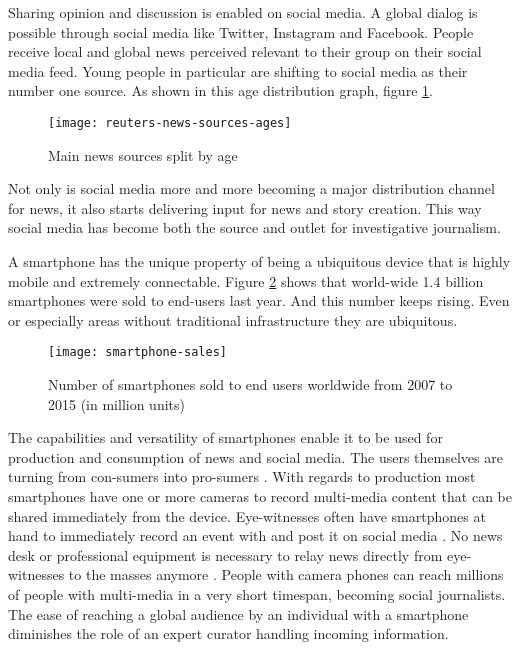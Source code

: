 Sharing opinion and discussion is enabled on social media.
A global dialog is possible through social media like Twitter, Instagram and Facebook.
People receive local and global news perceived relevant to their group on their social media feed.
Young people in particular are shifting to social media as their number one source. \cite{reuters_social_media}
As shown in this age distribution graph, figure \ref{fig:reuters-news-sources-ages}.
\begin{figure}[H]
	\centering
	\texttt{[image: reuters-news-sources-ages]}
	\caption{Main news sources split by age \cite{reuters_social_media}}
	\label{fig:reuters-news-sources-ages}
\end{figure}
Not only is social media more and more becoming a major distribution channel for news, it also starts delivering input for news and story creation.
This way social media has become both the source and outlet for investigative journalism.

A smartphone has the unique property of being a ubiquitous device that is highly mobile and extremely connectable.
Figure \ref{fig:smartphone-sales} shows that world-wide 1.4 billion smartphones were sold to end-users last year.
And this number keeps rising.
Even or especially areas without traditional infrastructure they are ubiquitous.
\begin{figure}[H]
	\centering
	\texttt{[image: smartphone-sales]}
	\caption{Number of smartphones sold to end users worldwide from 2007 to 2015 (in million units) \cite{smartphone-sales}}
	\label{fig:smartphone-sales}
\end{figure}

The capabilities and versatility of smartphones enable it to be used for production and consumption of news and social media.
The users themselves are turning from con-sumers into pro-sumers \cite{??}.
With regards to production most smartphones have one or more cameras to record multi-media content that can be shared immediately from the device.
Eye-witnesses often have smartphones at hand to immediately record an event with and post it on social media \cite{paris-attacks}.
No news desk or professional equipment is necessary to relay news directly from eye-witnesses to the masses anymore \cite{belgium-attacks}.
People with camera phones can reach millions of people with multi-media in a very short timespan, becoming social journalists.
The ease of reaching a global audience by an individual with a smartphone diminishes the role of an expert curator handling incoming information.


